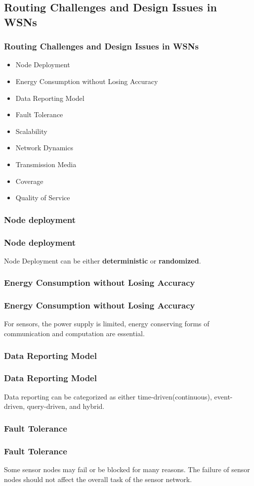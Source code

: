 \documentclass[xcolor=dvipsnames]{beamer}
\begin{document}
\subsection{Routing Challenges and Design Issues in WSNs}
\begin{frame}
	\frametitle{Routing Challenges and Design Issues in WSNs}
	\begin{itemize}
	\item Node Deployment
	\item Energy Consumption without Losing Accuracy
	\item Data Reporting Model
	\item Fault Tolerance
	\item Scalability
	\item Network Dynamics
	\item Transmission Media
	\item Coverage
	\item Quality of Service
	\end{itemize}
\end{frame}

\subsubsection{Node deployment}
\begin{frame}
\frametitle{Node deployment}
Node Deployment can be either \textbf{deterministic} or \textbf{randomized}.
\end{frame}

\subsubsection{Energy Consumption without Losing Accuracy}
\begin{frame}
\frametitle{Energy Consumption without Losing Accuracy}
For sensors, the power supply is limited, energy conserving forms of communication and computation are essential.
\end{frame}

\subsubsection{Data Reporting Model}
\begin{frame}
\frametitle{Data Reporting Model}
Data reporting can be categorized as either time-driven(continuous), event-driven, query-driven, and hybrid.
\end{frame}

\subsubsection{Fault Tolerance}
\begin{frame}
\frametitle{Fault Tolerance}
Some sensor nodes may fail or be blocked for many reasons. The failure of sensor nodes should not affect the overall task of the sensor network.
\end{frame}
\end{document}
